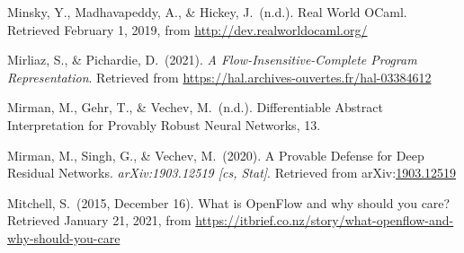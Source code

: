 \documentclass[12pt,twoside]{article}
\begin{document}
{\begin{thebibliography}{1079}
\mdbibitemlabel{}Minsky, Y., Madhavapeddy, A., \& Hickey, J.~(n.d.). Real World OCaml. Retrieved February 1, 2019, from \href{http://dev.realworldocaml.org/}{{\ttfamily http://\hspace{0pt}dev.\hspace{0pt}realworldocaml.\hspace{0pt}org/\hspace{0pt}}}%

\mdbibitemlabel{}Mirliaz, S., \& Pichardie, D.~(2021). \emph{A Flow-Insensitive-Complete Program Representation}. Retrieved from \href{https://hal.archives-ouvertes.fr/hal-03384612}{{\ttfamily https://\hspace{0pt}hal.\hspace{0pt}archives-\hspace{0pt}ouvertes.\hspace{0pt}fr/\hspace{0pt}hal-\hspace{0pt}03384612}}%

\mdbibitemlabel{}Mirman, M., Gehr, T., \& Vechev, M.~(n.d.). Differentiable Abstract Interpretation for Provably Robust Neural Networks, 13.%

\mdbibitemlabel{}Mirman, M., Singh, G., \& Vechev, M.~(2020). A Provable Defense for Deep Residual Networks. \emph{arXiv:1903.12519 {}[cs, Stat]}. Retrieved from arXiv:\href{http://arxiv.org/abs/1903.12519}{1903.12519}%

\mdbibitemlabel{}Mitchell, S.~(2015, December 16). What is OpenFlow and why should you care? Retrieved January 21, 2021, from \href{https://itbrief.co.nz/story/what-openflow-and-why-should-you-care}{{\ttfamily https://\hspace{0pt}itbrief.\hspace{0pt}co.\hspace{0pt}nz/\hspace{0pt}story/\hspace{0pt}what-\hspace{0pt}openflow-\hspace{0pt}and-\hspace{0pt}why-\hspace{0pt}should-\hspace{0pt}you-\hspace{0pt}care}}%


\end{thebibliography}}
\end{document}
